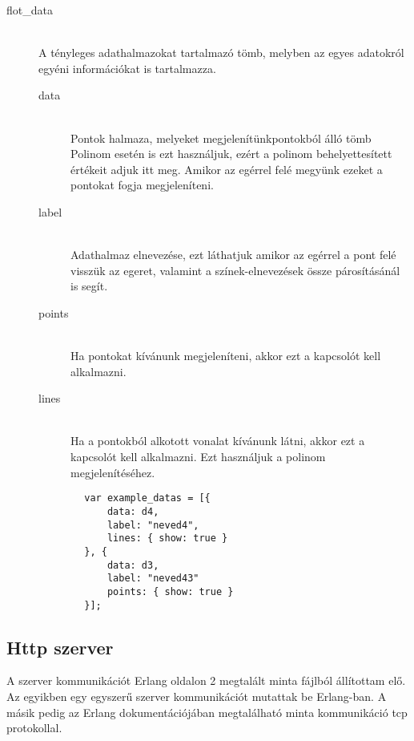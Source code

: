 \begin{description}
 		\item[flot\_data] \hfill \\ 
 		A tényleges adathalmazokat tartalmazó tömb, melyben az egyes adatokról egyéni információkat is tartalmazza.\newline
 		\begin{description}
			\item[data] \hfill \\ 
			Pontok halmaza, melyeket megjelenítünk\newline
			[x, y] pontokból álló tömb\newline
			Polinom esetén is ezt használjuk, ezért a polinom behelyettesített értékeit adjuk itt meg. Amikor az egérrel felé megyünk ezeket a pontokat fogja megjeleníteni.
			\item[label] \hfill \\ 
			Adathalmaz elnevezése, ezt láthatjuk amikor az egérrel a pont felé visszük az egeret, valamint a színek-elnevezések össze párosításánál is segít.
			\item[points] \hfill \\ 
			Ha pontokat kívánunk megjeleníteni, akkor ezt a kapcsolót kell alkalmazni.
			\item[lines] \hfill \\ 
			Ha a pontokból alkotott vonalat kívánunk látni, akkor ezt a kapcsolót kell alkalmazni. Ezt használjuk a polinom megjelenítéséhez.
		\end{description}
 		\begin{verbatim}
		var example_datas = [{
		    data: d4,
		    label: "neved4",
		    lines: { show: true }
		}, {
		    data: d3,
		    label: "neved43"
		    points: { show: true }
		}];
		\end{verbatim}
	\end{description}

\subsection{Http szerver \label{subsec:httpszerver}}
	A szerver kommunikációt Erlang oldalon 2 megtalált minta fájlból állítottam elő. Az egyikben egy egyszerű szerver kommunikációt mutattak be Erlang-ban\cite{simpleserver}. \newline
	A másik pedig az Erlang dokumentációjában megtalálható minta kommunikáció tcp protokollal\cite{tcpserver}.

